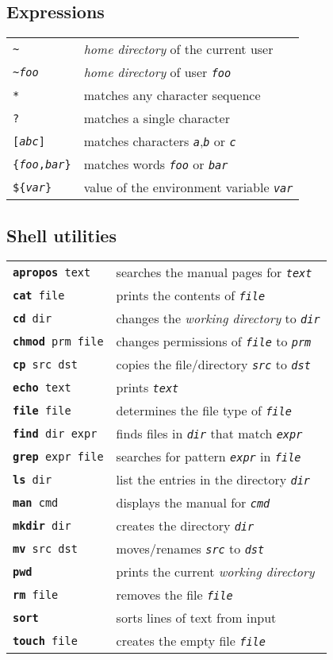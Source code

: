 \documentclass[landscape, a4paper]{article}
\newcommand{\cl}[1]{\texttt{#1}}
\newcommand{\cv}[1]{\textit{\texttt{#1}}}
\newcommand{\shcmd}[2]{\texttt{\textbf{#1} #2}}
\begin{document}
\begin{multicols*}{3}
\subsection*{Expressions}
\begin{tabular}{ll}
\cl{\textasciitilde}        & \textit{home directory} of the current user\\
\cl{\textasciitilde \cv{foo}}        & \textit{home directory} of user \cv{foo}\\
\cl{*}                      & matches any character sequence\\
\cl{?}                      & matches a single character\\
\cl{[\cv{abc}]}                  & matches characters \cv{a},\cv{b} or \cv{c}\\
\cl{\{\cv{foo},\cv{bar}\}}            & matches words \cv{foo} or \cv{bar}\\
\cl{\$\{}\cv{var}\cl{\}}    & value of the environment variable \cv{var}
\end{tabular}

\subsection*{Shell utilities}
\begin{tabular}{ll}
\shcmd{apropos}{text}       & searches the manual pages for \cv{text}\\
\shcmd{cat}{file}           & prints the contents of \cv{file}\\
\shcmd{cd}{dir}             & changes the \textit{working directory} to \cv{dir}\\
\shcmd{chmod}{prm file}     & changes permissions of \cv{file} to \cv{prm}\\
\shcmd{cp}{src dst}         & copies the file/directory \cv{src} to \cv{dst}\\
\shcmd{echo}{text}          & prints \cv{text}\\
\shcmd{file}{file}          & determines the file type of \cv{file}\\
\shcmd{find}{dir expr}      & finds files in \cv{dir} that match \cv{expr}\\
\shcmd{grep}{expr file}     & searches for pattern \cv{expr} in \cv{file}\\
\shcmd{ls}{dir}             & list the entries in the directory \cv{dir}\\
\shcmd{man}{cmd}            & displays the manual for \cv{cmd}\\
\shcmd{mkdir}{dir}          & creates the directory \cv{dir}\\
\shcmd{mv}{src dst}         & moves/renames \cv{src} to \cv{dst}\\
\shcmd{pwd}{}               & prints the current \textit{working directory}\\
\shcmd{rm}{file}            & removes the file \cv{file}\\
\shcmd{sort}{}              & sorts lines of text from input\\
\shcmd{touch}{file}         & creates the empty file \cv{file}
\end{tabular}

\end{multicols*}
\end{document}
